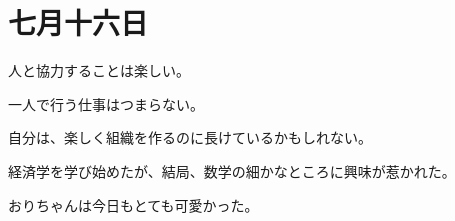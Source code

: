 \chapter{七月十六日}
人と協力することは楽しい。

一人で行う仕事はつまらない。

自分は、楽しく組織を作るのに長けているかもしれない。

経済学を学び始めたが、結局、数学の細かなところに興味が惹かれた。

おりちゃんは今日もとても可愛かった。
